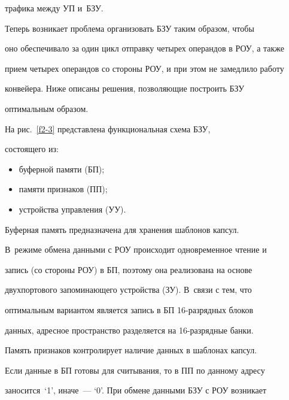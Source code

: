 трафика между УП и~БЗУ.


      


      Теперь возникает проблема организовать БЗУ таким образом, чтобы 


оно обеспечивало за один цикл отправку четырех операндов в РОУ, а также 


прием четырех операндов со стороны РОУ, и при этом не замедлило работу 


конвейера. Ниже описаны решения, позволяющие построить БЗУ 


оптимальным образом.


      


      На рис.~\ref{f2-3} представлена функциональная схема БЗУ, 


состоящего из:


      \begin{itemize}


\item буферной памяти (БП);


\item памяти признаков (ПП);


\item устройства управления (УУ).


\end{itemize}





      Буферная память предназначена для хранения шаблонов кап\-сул. 


В~режиме обмена данными с РОУ происходит одновременное чтение и 


запись (со стороны РОУ) в БП, поэтому она реализована на основе 


двухпортового запоминающего устройства (ЗУ). В~связи с тем, что 


оптимальным вариантом является запись в БП 16-раз\-ряд\-ных блоков 


данных, адресное пространство разделяется на 16-раз\-ряд\-ные банки.


      


      Память признаков контролирует наличие данных в шаблонах капсул. 


Если данные в БП готовы для считывания, то в ПП по данному адресу 


заносится~`1', иначе~--- `0'. При обмене данными БЗУ с РОУ возникает 


